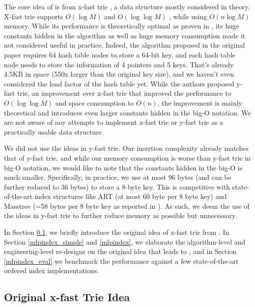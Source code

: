 \documentclass[11pt, usletter]{article}
\begin{document}
The core idea of \MlpIndex is from x-fast trie \cite{xfast}, a data structure mostly considered in theory.
X-fast trie supports $O(\log M)$ \insertion and $O(\log\log M)$ \lowerbound, while using $O(n\log M)$ memory.
While its \lowerbound performance is theoretically optimal as proven in \cite{ajtai88comb-lowerbound},
its huge constants hidden in the algorithm as well as huge memory consumption made it not considered useful in practice. 
Indeed, the algorithm proposed in the original paper requires 64 hash table nodes to store a 64-bit key, 
and each hash table node needs to store the information of 4 pointers and 5 keys. 
That's already 4.5KB in space (550x larger than the original key size), 
and we haven't even considered the load factor of the hash table yet. 
While the authors proposed y-fast trie, 
an improvement over x-fast trie that improved the \insertion performance to $O(\log\log M)$ and space consumption to $O(n)$, 
the improvement is mainly theoretical and introduces even larger constants hidden in the big-O notation. 
We are not aware of any attempts to implement x-fast trie or y-fast trie as a practically usable data structure. 

We did not use the ideas in y-fast trie. Our insertion complexity already matches that of y-fast trie, 
and while our memory consumption is worse than y-fast trie in big-O notation, 
we would like to note that the constants hidden in the big-O is much smaller.
Specifically, in practice, we use at most 96 bytes (and can be further reduced to 36 bytes) to store a 8-byte key. 
This is competitive with state-of-the-art index structures like ART \cite{arttrie_icde13} (at most 60 byte per 8 byte key) 
and Masstree \cite{masstree} ($\sim$58 bytes per 8 byte key as reported in \cite{hot_sigmod18}).
As such, we deem the use of the ideas in y-fast trie to further reduce memory as possible but unnecessary.

In Section \ref{intro_xfast}, we briefly introduce the original idea of x-fast trie from \cite{xfast}. 
In Section \ref{mlpindex_simple} and \ref{mlpindex}, 
we elaborate the algorithm-level and engineering-level re-designs on the original idea that leads to \MlpIndex, 
and in Section \ref{mlpindex_eval} we benchmark the performance against a few state-of-the-art ordered index implementations. 

\subsection{Original x-fast Trie Idea} \label{intro_xfast}
\end{document}
